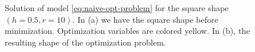 \begin{figure}
\center
{}
\caption{Solution of model \eqref{eq:naive-opt-problem} for the square shape $(h=0.5,r=10)$. In (a) we have the square shape before minimization. Optimization variables are colored yellow. In (b), the resulting shape of the optimization problem. }
\label{fig:naive-opt-problem}
\end{figure}

